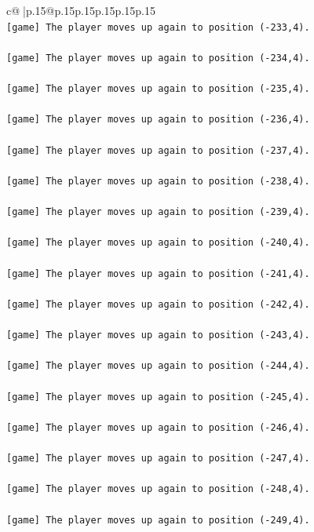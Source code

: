 \documentclass{article}
\begin{document}
{\begin{supertabular}{c@{$\;$}|p{.15\linewidth}@{}p{.15\linewidth}p{.15\linewidth}p{.15\linewidth}p{.15\linewidth}p{.15\linewidth}}
{{{\\ 
\texttt{{[}game{]} The player moves up again to position ({-}233,4).} \\
\\ 
\texttt{{[}game{]} The player moves up again to position ({-}234,4).} \\
\\ 
\texttt{{[}game{]} The player moves up again to position ({-}235,4).} \\
\\ 
\texttt{{[}game{]} The player moves up again to position ({-}236,4).} \\
\\ 
\texttt{{[}game{]} The player moves up again to position ({-}237,4).} \\
\\ 
\texttt{{[}game{]} The player moves up again to position ({-}238,4).} \\
\\ 
\texttt{{[}game{]} The player moves up again to position ({-}239,4).} \\
\\ 
\texttt{{[}game{]} The player moves up again to position ({-}240,4).} \\
\\ 
\texttt{{[}game{]} The player moves up again to position ({-}241,4).} \\
\\ 
\texttt{{[}game{]} The player moves up again to position ({-}242,4).} \\
\\ 
\texttt{{[}game{]} The player moves up again to position ({-}243,4).} \\
\\ 
\texttt{{[}game{]} The player moves up again to position ({-}244,4).} \\
\\ 
\texttt{{[}game{]} The player moves up again to position ({-}245,4).} \\
\\ 
\texttt{{[}game{]} The player moves up again to position ({-}246,4).} \\
\\ 
\texttt{{[}game{]} The player moves up again to position ({-}247,4).} \\
\\ 
\texttt{{[}game{]} The player moves up again to position ({-}248,4).} \\
\\ 
\texttt{{[}game{]} The player moves up again to position ({-}249,4).} \\
}}}
\end{supertabular}}
\end{document}
